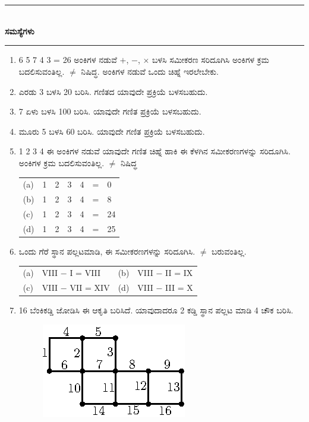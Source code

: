 \chapter[ಅಧ್ಯಾಯ 11]{}\label{chap11}

\begin{center}
\rule{5cm}{1pt}\\[5pt]
{\Large\bfseries ಸಮಸ್ಯೆಗಳು}\\[3pt]
\rule{5cm}{1pt}
\end{center}

\begin{enumerate}
\renewcommand{\labelenumi}{\bf\theenumi.}
\itemsep=5pt
\item 6 5 7 4 3 = 26 ಅಂಕಿಗಳ ನಡುವೆ $+$, $-$, $\times$ ಬಳಸಿ ಸಮೀಕರಣ ಸರಿದೂಗಿಸಿ ಅಂಕಿಗಳ ಕ್ರಮ ಬದಲಿಸುವಂತಿಲ್ಲ. $\neq$ ನಿಷಿದ್ಧ. ಅಂಕಿಗಳ ನಡುವೆ ಒಂದು ಚಿಹ್ನೆ ಇರಲೇಬೇಕು. 

\item ಎರಡು 3 ಬಳಸಿ 20 ಬರಿಸಿ. ಗಣಿತದ ಯಾವುದೇ ಪ್ರಕ್ರಿಯೆ ಬಳಸಬಹುದು. 

\item 7 ಏಳು ಬಳಸಿ 100 ಬರಿಸಿ. ಯಾವುದೇ ಗಣಿತ ಪ್ರಕ್ರಿಯೆ ಬಳಸಬಹುದು. 

\item ಮೂರು 5 ಬಳಸಿ 60 ಬರಿಸಿ. ಯಾವುದೇ ಗಣಿತ ಪ್ರಕ್ರಿಯೆ ಬಳಸಬಹುದು. 

\item 1 2 3 4 ಈ ಅಂಕಿಗಳ ನಡುವೆ ಯಾವುದೇ ಗಣಿತ ಚಿಹ್ನೆ ಹಾಕಿ ಈ ಕೆಳಗಿನ ಸಮೀಕರಣಗಳನ್ನು ಸರಿದೂಗಿಸಿ. ಅಂಕಿಗಳ ಕ್ರಮ ಬದಲಿಸುವಂತಿಲ್ಲ. $\neq$ ನಿಷಿದ್ಧ 
\begin{tabular}[t]{lllllll}
(a) & 1 & 2 & 3 & 4 & = & 0 \\
(b) & 1 & 2 & 3 & 4 & = & 8\\
(c) & 1 & 2 & 3 & 4 & = & 24\\
(d) & 1 & 2 & 3 & 4 & = & 25
\end{tabular}

\item ಒಂದು ಗೆರೆ ಸ್ಥಾನ ಪಲ್ಲಟಮಾಡಿ, ಈ ಸಮೀಕರಣಗಳನ್ನು ಸರಿದೂಗಿಸಿ. $\neq$ ಬರು\break ವಂತಿಲ್ಲ. 

\begin{tabular}{l@{\;\;}l@{\;\;}l@{\;\;}l@{\;\;}}
(a) & VIII $-$ I = VIII & (b) & VIII $-$ II = IX\\
(c) & VIII $-$ VII = XIV & (d) & VIII $-$ III = X
\end{tabular}

\item 16 ಬೆಂಕಿಕಡ್ಡಿ ಜೋಡಿಸಿ ಈ ಆಕೃತಿ ಬರಿಸಿದೆ. ಯಾವುದಾದರೂ 2 ಕಡ್ಡಿ ಸ್ಥಾನ ಪಲ್ಲಟ ಮಾಡಿ 4 ಚೌಕ ಬರಿಸಿ. 
\begin{figure}[H]
\centering
\includegraphics[scale=1.1]{images/chap11/q7.eps}
\end{figure}


\end{enumerate}
